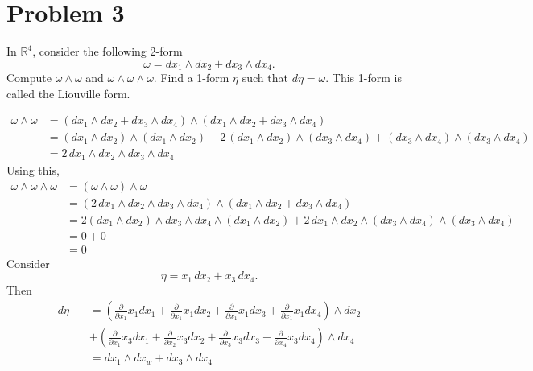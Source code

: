 \documentclass[11pt]{article}
\begin{document}
\section*{Problem 3}
In $\mathbb{R}^4$, consider the following 2-form 
\[ \omega = dx_1 \wedge dx_2 + dx_3 \wedge dx_4. \]
Compute $\omega \wedge \omega$ and $\omega \wedge \omega \wedge \omega$. Find a 1-form $\eta$ such that $d\eta = \omega$. This 1-form is called the Liouville form.
\begin{solution}
    \begin{align*}
        \omega\wedge \omega &= (dx_1 \wedge dx_2 + dx_3 \wedge dx_4) \wedge(dx_1 \wedge dx_2 + dx_3 \wedge dx_4) \\
        &= (dx_1 \wedge dx_2)\wedge (dx_1 \wedge dx_2) + 2\,(dx_1 \wedge dx_2)\wedge (dx_3 \wedge dx_4)+ (dx_3 \wedge dx_4)\wedge (dx_3 \wedge dx_4)\\
        &= 2 \,dx_1 \wedge dx_2 \wedge dx_3 \wedge dx_4
    \end{align*}
    Using this, 
    \begin{align*}
        \omega \wedge \omega \wedge \omega &= (\omega \wedge \omega) \wedge \omega\\
        &= (2 \,dx_1 \wedge dx_2 \wedge dx_3 \wedge dx_4) \wedge (dx_1 \wedge dx_2 + dx_3 \wedge dx_4)\\
        &= 2(dx_1 \wedge dx_2) \wedge dx_3 \wedge dx_4 \wedge (dx_1 \wedge dx_2) + 2\,dx_1 \wedge dx_2 \wedge (dx_3 \wedge dx_4) \wedge (dx_3 \wedge dx_4)\\
        &= 0 + 0\\
        &= 0
    \end{align*}
    Consider 
    \[\eta = x_1 \,dx_2 + x_3 \, dx_4.\]
    Then 
    \begin{align*}
        d\eta &= \left(\frac{\partial }{\partial x_1}x_1 dx_1 +   \frac{\partial }{\partial x_1}x_1 dx_2 + \frac{\partial }{\partial x_1}x_1 dx_3 + \frac{\partial }{\partial x_1}x_1 dx_4\right)\wedge dx_2\\
        \qquad &+ \left(\frac{\partial }{\partial x_1}x_3 dx_1 +   \frac{\partial }{\partial x_2}x_3 dx_2 + \frac{\partial }{\partial x_3}x_3 dx_3 + \frac{\partial }{\partial x_4}x_3 dx_4\right)\wedge dx_4\\
        &= dx_1 \wedge dx_w + dx_3 \wedge dx_4
    \end{align*}
\end{solution}

\newpage
\end{document}
